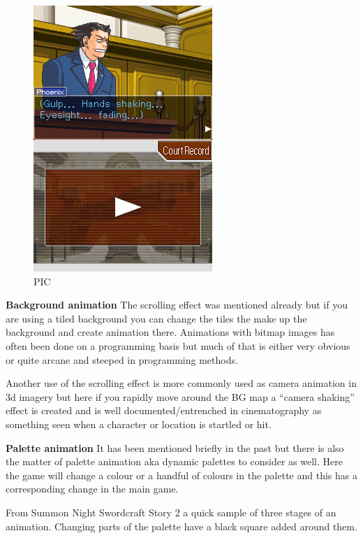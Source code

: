 \documentclass[
]{book}
\begin{document}
\begin{figure}
\centering
\includegraphics{images/52_home_fast6191_romhackingguide_unrenamed_file___nal_borders_romhackingguideOAManimation_2_2.png}
\caption{PIC}
\end{figure}

\textbf{Background animation} The scrolling effect was mentioned already but if you are using a tiled background you can change the tiles the make up the background and create animation there. Animations with bitmap images has often been done on a programming basis but much of that is either very obvious or quite arcane and steeped in programming methods.

Another use of the scrolling effect is more commonly used as camera animation in 3d imagery but here if you rapidly move around the BG map a ``camera shaking'' effect is created and is well documented/entrenched in cinematography as something seen when a character or location is startled or hit.

\textbf{Palette animation} It has been mentioned briefly in the past but there is also the matter of palette animation aka dynamic palettes to consider as well. Here the game will change a colour or a handful of colours in the palette and this has a corresponding change in the main game.

From Summon Night Swordcraft Story 2 a quick sample of three stages of an animation. Changing parts of the palette have a black square added around them.
\end{document}
